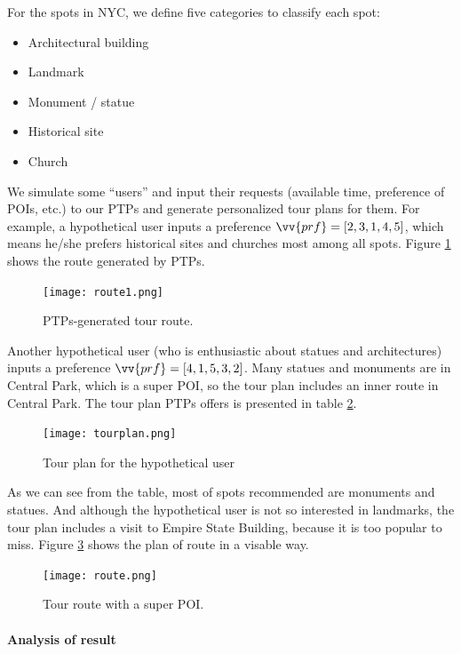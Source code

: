 \documentclass{mcmthesis}
\begin{document}
  For the spots in NYC, we define five categories to classify each spot: \par
  \begin{itemize}
    \item Architectural building
    \item Landmark
    \item Monument / statue
    \item Historical site
    \item Church
  \end{itemize}
  We simulate some ``users'' and input their requests (available time, preference of POIs, etc.) to our PTPs and generate personalized tour plans for them. For example, a hypothetical user inputs a preference $\vv{prf} = [2,3,1,4,5]$, which means he/she prefers historical sites and churches most among all spots. Figure \ref{fig:route1} shows the route generated by PTPs.\par
  \begin{figure}[h]
    \centering
    \texttt{[image: route1.png]}
    \caption{PTPs-generated tour route.}
    \label{fig:route1}
  \end{figure}
  Another hypothetical user (who is enthusiastic about statues and architectures) inputs a preference $\vv{prf} = [4, 1, 5, 3, 2]$. Many statues and monuments are in Central Park, which is a super POI, so the tour plan includes an inner route in Central Park. The tour plan PTPs offers is presented in table \ref{fig:table}.
  \begin{figure}[h]
    \centering
    \texttt{[image: tourplan.png]}
    \caption{Tour plan for the hypothetical user}
    \label{fig:table}
  \end{figure}
  As we can see from the table, most of spots recommended are monuments and statues. And although the hypothetical user is not so interested in landmarks, the tour plan includes a visit to Empire State Building, because it is too popular to miss. Figure \ref{fig:route} shows the plan of route in a visable way.
  \begin{figure}[h]
    \centering
    \texttt{[image: route.png]}
    \caption{Tour route with a super POI.}
    \label{fig:route}
  \end{figure}
  \paragraph{Analysis of result} \
  
\end{document}
